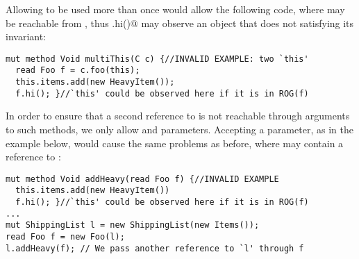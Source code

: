 Allowing \Q@this@ to be used more than once 
would allow the following code, where 
\Q@this@ may be reachable from \Q@f@, thus \Q@f.hi()@ may observe an object that does not satisfying its invariant:
\begin{lstlisting}
mut method Void multiThis(C c) {//INVALID EXAMPLE: two `this'
  read Foo f = c.foo(this);
  this.items.add(new HeavyItem());
  f.hi(); }//`this' could be observed here if it is in ROG(f)
\end{lstlisting}
\noindent In order to ensure that a second reference to \Q@this@ is not reachable through arguments to such methods, we only allow \Q@imm@ and \Q@capsule@ parameters.
Accepting a \Q@read@ parameter, as in the example below,
would cause the same problems as before, where \Q@f@ may contain
a reference to \Q@this@:
\begin{lstlisting}
mut method Void addHeavy(read Foo f) {//INVALID EXAMPLE
  this.items.add(new HeavyItem())
  f.hi(); }//`this' could be observed here if it is in ROG(f)
...
mut ShippingList l = new ShippingList(new Items());
read Foo f = new Foo(l);
l.addHeavy(f); // We pass another reference to `l' through f
\end{lstlisting}%
%
%
